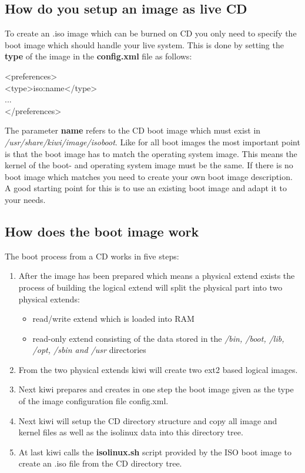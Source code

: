 \subsection{How do you setup an image as live CD}
To create an .iso image which can be burned on CD you only need
to specify the boot image which should handle your live system.
This is done by setting the \textbf{type} of the image in the
\textbf{config.xml} file as follows:

\begin{Command}{9cm}
<preferences>\\
\hspace*{1cm}<type>iso:name</type>\\
\hspace*{1cm}...\\
</preferences>
\end{Command}

The parameter \textbf{name} refers to the CD boot image which
must exist in \textit{/usr/share/kiwi/image/isoboot}. Like for all boot
images the most important point is that the boot image has to
match the operating system image. This means the kernel of the boot-
and operating system image must be the same. If there is no
boot image which matches you need to create your own boot image
description. A good starting point for this is to use an existing
boot image and adapt it to your needs.

\subsection{How does the boot image work}
The boot process from a CD works in five steps:

\begin{enumerate}
\item After the image has been prepared which means a physical extend
      exists the process of building the logical extend will split
      the physical part into two physical extends:
      \begin{itemize}
      \item read/write extend which is loaded into RAM
      \item read-only extend consisting of the data stored
            in the \textit{/bin, /boot, /lib, /opt, /sbin and /usr}
            directories
      \end{itemize}
\item From the two physical extends kiwi will create two ext2
      based logical images.
\item Next kiwi prepares and creates in one step the boot image given 
      as the type of the image configuration file config.xml.
\item Next kiwi will setup the CD directory structure and copy all
      image and kernel files as well as the isolinux data into this
      directory tree.
\item At last kiwi calls the \textbf{isolinux.sh} script provided
      by the ISO boot image to create an .iso file from the CD
      directory tree.
\end{enumerate}

